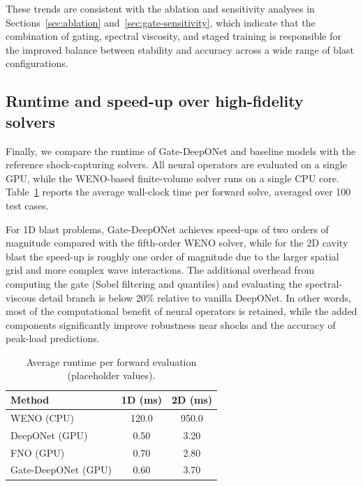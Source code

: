 \documentclass[a4paper,fleqn]{cas-dc}
\begin{document}
These trends are consistent with the ablation and sensitivity analyses in
Sections~\ref{sec:ablation} and~\ref{sec:gate-sensitivity}, which indicate
that the combination of gating, spectral viscosity, and staged training is
responsible for the improved balance between stability and accuracy across
a wide range of blast configurations.

\subsection{Runtime and speed-up over high-fidelity solvers}
\label{sec:runtime}

Finally, we compare the runtime of Gate-DeepONet and baseline models with
the reference shock-capturing solvers. All neural operators are evaluated
on a single GPU, while the WENO-based finite-volume solver runs on a single
CPU core. Table~\ref{tab:runtime} reports the average wall-clock time per
forward solve, averaged over 100 test cases.

For 1D blast problems, Gate-DeepONet achieves speed-ups of two orders of
magnitude compared with the fifth-order WENO solver, while for the 2D
cavity blast the speed-up is roughly one order of magnitude due to the
larger spatial grid and more complex wave interactions. The additional
overhead from computing the gate (Sobel filtering and quantiles) and
evaluating the spectral-viscous detail branch is below 20\% relative to
vanilla DeepONet. In other words, most of the computational benefit of
neural operators is retained, while the added components significantly
improve robustness near shocks and the accuracy of peak-load predictions.

\begin{table}[t]
\caption{Average runtime per forward evaluation (placeholder values).}
\label{tab:runtime}
\begin{tabular*}{\tblwidth}{@{}lcc@{}}
\toprule
Method & 1D (ms) & 2D (ms) \\
\midrule
WENO (CPU)          & 120.0 & 950.0 \\
DeepONet (GPU)      & 0.50  & 3.20 \\
FNO (GPU)           & 0.70  & 2.80 \\
Gate-DeepONet (GPU) & 0.60  & 3.70 \\
\bottomrule
\end{tabular*}
\end{table}



\end{document}
